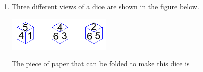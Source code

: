 \documentclass[12pt]{article}
\newcommand{\rupee}{\text{Rs.}}
\begin{document}
\begin{enumerate}
At the end of one year, the total amount that Person 1 gets is \rupee500 more than Person 2. The annual rate of return for the mutual funds B and C is 15\% each. What is the annual rate of return for the mutual fund A?

\begin{enumerate}
\item 7.5\%
\item 10\%
\item 15\%
\item 20\%
\end{enumerate}
\hfill (GATE CY 2024)

\item Three different views of a dice are shown in the figure below.

\begin{center}
\includegraphics[width=0.35\columnwidth]{figs/q9.png}
\label{fig:q9}
\end{center}

The piece of paper that can be folded to make this dice is


\end{enumerate}
\end{document}
